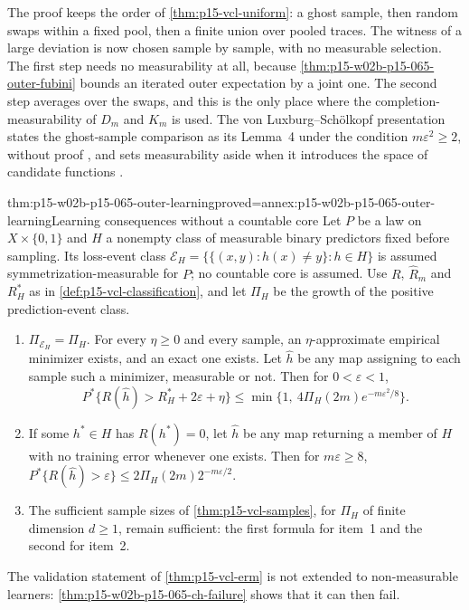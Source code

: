 The proof keeps the order of \cref{thm:p15-vcl-uniform}: a ghost sample,
then random swaps within a fixed pool, then a finite union over pooled
traces. The witness of a large deviation is now chosen sample by sample,
with no measurable selection. The first step needs no measurability at all,
because \cref{thm:p15-w02b-p15-065-outer-fubini} bounds an iterated outer
expectation by a joint one. The second step averages over the swaps, and
this is the only place where the completion-measurability of \(D_m\) and
\(K_m\) is used. The von Luxburg--Sch\"olkopf presentation states the
ghost-sample comparison as its Lemma~4 under the condition
\(m\varepsilon^2\geq2\), without proof
\cite[Section~5.2, p.~17]{LuxburgScholkopf2008Author}, and sets
measurability aside when it introduces the space of candidate functions
\cite[Section~2.2, p.~5]{LuxburgScholkopf2008Author}.

\begin{hbtheorem}{thm:p15-w02b-p15-065-outer-learning}{proved=annex:p15-w02b-p15-065-outer-learning}{Learning consequences without a countable core}
Let \(P\) be a law on \(X\times\{0,1\}\) and \(H\) a nonempty class of
measurable binary predictors fixed before sampling. Its loss-event class
\(\mathcal E_H=\{\{(x,y):h(x)\ne y\}:h\in H\}\) is assumed
symmetrization-\allowbreak measurable for \(P\); no countable core is assumed. Use
\(R\), \(\widehat R_m\) and \(R_H^{*}\) as in
\cref{def:p15-vcl-classification}, and let \(\Pi_H\) be the growth of the
positive prediction-event class.
\begin{enumerate}
\item \(\Pi_{\mathcal E_H}=\Pi_H\). For every \(\eta\geq0\) and every
      sample, an \(\eta\)-approximate empirical minimizer exists, and an
      exact one exists. Let \(\widehat h\) be any map assigning to each
      sample such a minimizer, measurable or not. Then for
      \(0<\varepsilon<1\),
      \[
       P^{*}\{R(\widehat h)>R_H^{*}+2\varepsilon+\eta\}
       \leq\min\{1,\ 4\Pi_H(2m)e^{-m\varepsilon^2/8}\}.
      \]
\item If some \(h^{*}\in H\) has \(R(h^{*})=0\), let \(\widehat h\) be any map
      returning a member of \(H\) with no training error whenever one
      exists. Then for \(m\varepsilon\geq8\),
      \(P^{*}\{R(\widehat h)>\varepsilon\}\leq2\Pi_H(2m)2^{-m\varepsilon/2}\).
\item The sufficient sample sizes of \cref{thm:p15-vcl-samples}, for
      \(\Pi_H\) of finite dimension \(d\geq1\), remain sufficient: the first
      formula for item~1 and the second for item~2.
\end{enumerate}
The validation statement of \cref{thm:p15-vcl-erm} is not extended to
non-measurable learners: \cref{thm:p15-w02b-p15-065-ch-failure} shows that
it can then fail.
\end{hbtheorem}

